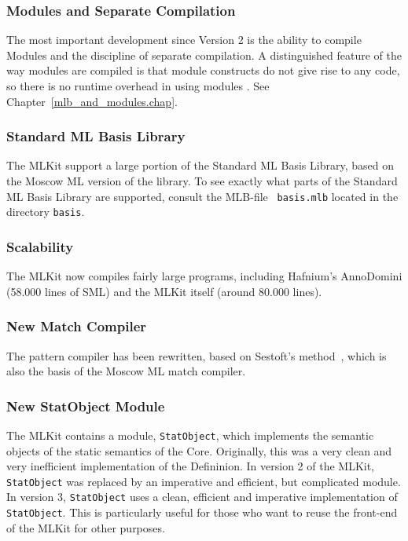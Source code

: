 \documentclass[12pt]{book}
\begin{document}
\subsubsection*{Modules and Separate Compilation}
The most important development since Version 2 is the ability to
compile Modules and the discipline of separate compilation. A
distinguished feature of the way modules are compiled is that module
constructs do not give rise to any code, so there is no runtime
overhead in using modules \cite{ElsmanICFP99,ElsmanThesis}. See
Chapter~\ref{mlb_and_modules.chap}.

\subsubsection*{Standard ML Basis Library}
The MLKit support a large portion of the  Standard ML Basis Library, based on the Moscow ML
version of the library. To see exactly what parts of the Standard ML
Basis Library are supported, consult the MLB-file {\tt
  basis.mlb} located in the directory {\tt basis}.

\subsubsection*{Scalability}
The MLKit now compiles fairly large programs, including Hafnium's AnnoDomini
(58.000 lines of SML) and the MLKit itself (around 80.000 lines).

\subsubsection*{New Match Compiler}
The pattern compiler has been rewritten, based on Sestoft's
method~\cite{sestoft96}, which is also the basis of the Moscow ML
match compiler.

\subsubsection*{New StatObject Module}
The MLKit contains a module,
%
{\tt StatObject}, which implements the semantic objects of the static
semantics of the Core.  Originally, this was a very clean and very
inefficient implementation of the Defininion. In version 2 of the MLKit,
{\tt StatObject} was replaced by an imperative and efficient, but
complicated module.  In version 3, {\tt StatObject} uses a clean,
efficient and imperative implementation of {\tt StatObject}. This is
particularly useful for those who want to reuse the front-end of the
MLKit for other purposes.
\end{document}
